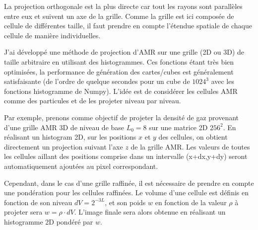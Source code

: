 La projection orthogonale est la plus directe car tout les rayons sont parallèles entre eux et suivent un axe de la grille.
Comme la grille est ici composée de cellule de différentes taille, il faut prendre en compte l'étendue spatiale de chaque cellule de manière individuelles.

J'ai développé une méthode de projection d'\ac{AMR} sur une grille (2D ou 3D) de taille arbitraire en utilisant des histogrammes.
Ces fonctions étant très bien optimisées, la performance de génération des cartes/cubes est généralement satisfaisante (de l'ordre de quelque secondes pour un cube de $1024^3$ avec les fonctions histogramme de Numpy).
L'idée est de considérer les cellules \ac{AMR} comme des particules et de les projeter niveau par niveau.



Par exemple, prenons comme objectif de projeter la densité de gaz provenant d'une grille \ac{AMR} 3D de niveau de base $L_{0}=8$ sur une matrice 2D $256^2$.
En réalisant un histogram 2D, sur les positions $x$ et $y$ des cellules, on obtient directement un projection suivant l'axe $z$ de la grille \ac{AMR}.
Les valeurs de toutes les cellules aillant des positions comprise dans un intervalle (x+dx,y+dy) seront automatiquement ajoutées au pixel correspondant.

Cependant, dans le cas d'une grille raffinée, il est nécessaire de prendre en compte une pondération pour les cellules raffinées.
Le volume d'une cellule est définis en fonction de son niveau $dV= 2^{-3L}$, et son poids $w$ en fonction de la valeur $\rho$ à projeter sera $w = \rho \cdot dV$.
L'image finale sera alors obtenue en réalisant un histogramme 2D pondéré par $w$.





